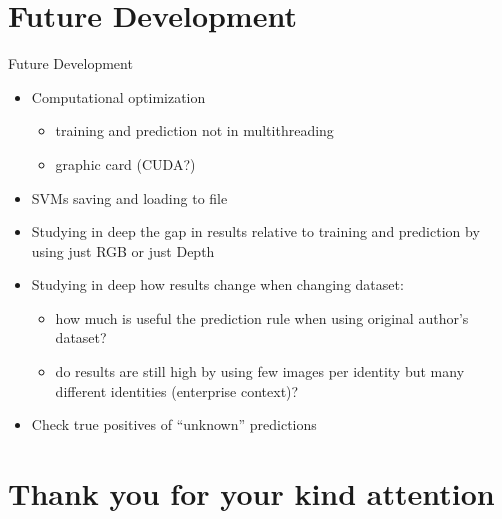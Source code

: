 \documentclass[unknownkeysallowed]{beamer}
\begin{document}
\section{Future Development}
\begin{frame}{Future Development}
	\begin{itemize}
		\item Computational optimization
			\begin{itemize}
				\item training and prediction not in multithreading
				\item graphic card (CUDA?)
			\end{itemize}
		\item SVMs saving and loading to file
		\item Studying in deep the gap in results relative to training
			and prediction by using just RGB or just Depth
		\item Studying in deep how results change when changing dataset:
			\begin{itemize}
				\item how much is useful the prediction rule when
					using original author's dataset?
				\item do results are still high by using few
					images per identity but many different
					identities (enterprise context)?
			\end{itemize}
		\item Check true positives of ``unknown''
			predictions

	\end{itemize}
\end{frame}

\section*{Thank you for your kind attention}
\end{document}
